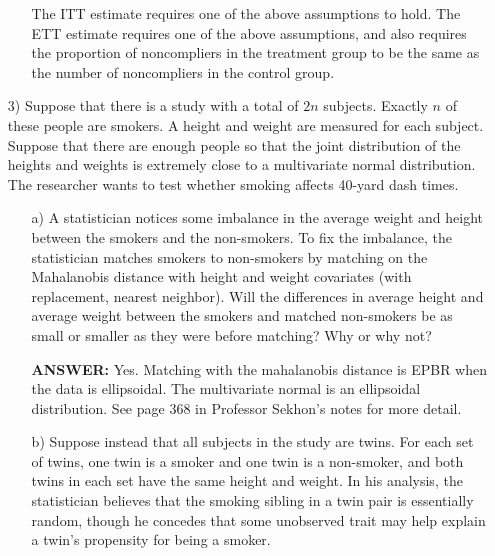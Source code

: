 \documentclass{article}
\begin{document}
\begin{itemize}
\begin{itemize}
          The ITT estimate requires one of the above assumptions to hold.
          The ETT estimate requires one of the  above assumptions, and also requires the proportion
          of noncompliers in the treatment group to be the same as the number of noncompliers
          in the control group.
      \end{itemize}
    \item[3)]  
      Suppose that there is a study with 
      a total of $2n$ subjects.
      Exactly $n$ of these people are smokers.
      A height and weight are measured for
      each subject.
      Suppose that there are enough people so that
      the joint distribution of the heights and weights is extremely close to a
      multivariate normal distribution.
      The researcher wants to test whether smoking affects 40-yard dash times.
      \begin{itemize}
        \item[a)]
          A statistician notices some imbalance in the average weight and height 
          between the smokers and the non-smokers.         
          To fix the imbalance, the statistician matches smokers
          to non-smokers by matching 
          on the Mahalanobis distance with height and weight covariates          
          (with replacement, nearest neighbor).
          Will the differences in average height and average
          weight between the smokers
          and matched non-smokers            
          be as small or smaller as they were before matching?  
          Why or why not?
          
          \textbf{ANSWER:} Yes.  
          Matching with the mahalanobis distance
          is EPBR when the data is ellipsoidal. 
          The multivariate normal is an ellipsoidal distribution.
          See page 368 in Professor Sekhon's notes for more detail.
        \item[b)]
          Suppose instead that all subjects in the study are twins.
          For each set of twins, one twin is a smoker and one twin is a non-smoker,
          and both twins in each set have the same height and weight.
          In his analysis, the statistician believes that 
          the smoking sibling in a twin pair 
          is essentially random, though he concedes
          that some unobserved trait may help explain a twin's 
          propensity for being a smoker.
           

\end{itemize}
\end{itemize}
\end{document}
